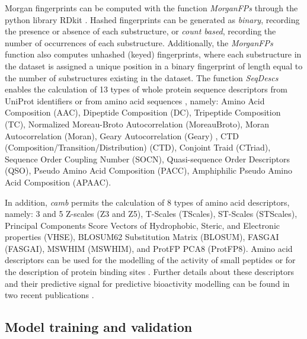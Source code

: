 \documentclass[twoside,a4wide,10pt]{article}
\begin{document}
Morgan fingerprints can be computed with the function {\it MorganFPs}
through the python library RDkit \citep{rdkit}.
Hashed fingerprints can be generated as \textit{binary}, recording the presence or absence of each substructure,
 or \textit{count based}, recording the number of occurrences of each substructure.
Additionally, the {\it MorganFPs} function also computes unhashed (keyed) fingerprints, 
where each substructure in the dataset is assigned a unique position in a binary fingerprint of length equal to the number of substructures existing in the dataset.
The function {\it SeqDescs} enables the calculation of 13 types of whole protein sequence descriptors
from UniProt identifiers or from amino acid sequences \citep{protr}, namely:
Amino Acid Composition (AAC), Dipeptide Composition (DC), Tripeptide Composition (TC), Normalized Moreau-Broto Autocorrelation (MoreauBroto), Moran Autocorrelation (Moran), Geary Autocorrelation (Geary) , CTD (Composition/Transition/Distribution) (CTD), Conjoint Traid (CTriad), Sequence Order Coupling Number (SOCN), Quasi-sequence Order Descriptors (QSO), Pseudo Amino Acid Composition (PACC), Amphiphilic Pseudo Amino Acid Composition (APAAC).

In addition, {\it camb} permits the calculation of 8 types of amino acid descriptors, namely:
3 and 5 Z-scales (Z3 and Z5), T-Scales (TScales), ST-Scales (STScales), 
Principal Components Score Vectors of Hydrophobic, Steric, and Electronic properties (VHSE), 
BLOSUM62 Substitution Matrix (BLOSUM), FASGAI (FASGAI), MSWHIM (MSWHIM), and ProtFP PCA8 (ProtFP8).
Amino acid descriptors can be used for the modelling of the activity of small peptides
or for the description of protein binding sites \citep{AA_benchmark,adenosine,cortesCOX,cortesReview}.
Further details about these descriptors and their predictive signal
for predictive bioactivity modelling can be found in two recent publications \citep{AA_benchmark1,AA_benchmark}.

\subsection{Model training and validation}
\end{document}
